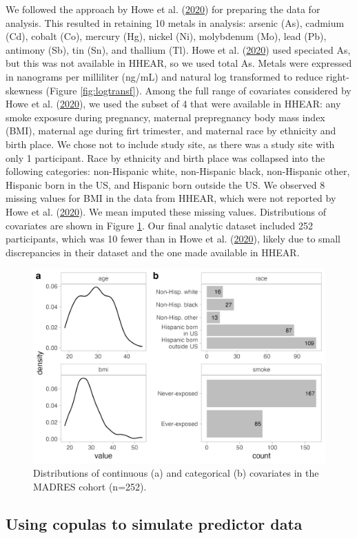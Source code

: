 \documentclass[12pt, twoside]{amherstthesis}
\begin{document}
We followed the approach by Howe et al. (\protect\hyperlink{ref-howe_prenatal_2020}{2020}) for preparing the data for analysis. This resulted in retaining 10 metals in analysis: arsenic (As), cadmium (Cd), cobalt (Co), mercury (Hg), nickel (Ni), molybdenum (Mo), lead (Pb), antimony (Sb), tin (Sn), and thallium (Tl). Howe et al. (\protect\hyperlink{ref-howe_prenatal_2020}{2020}) used speciated As, but this was not available in HHEAR, so we used total As. Metals were expressed in nanograms per milliliter (ng/mL) and natural log transformed to reduce right-skewness (Figure \ref{fig:logtransf}). Among the full range of covariates considered by Howe et al. (\protect\hyperlink{ref-howe_prenatal_2020}{2020}), we used the subset of 4 that were available in HHEAR: any smoke exposure during pregnancy, maternal prepregnancy body mass index (BMI), maternal age during firt trimester, and maternal race by ethnicity and birth place. We chose not to include study site, as there was a study site with only 1 participant. Race by ethnicity and birth place was collapsed into the following categories: non-Hispanic white, non-Hispanic black, non-Hispanic other, Hispanic born in the US, and Hispanic born outside the US. We observed 8 missing values for BMI in the data from HHEAR, which were not reported by Howe et al. (\protect\hyperlink{ref-howe_prenatal_2020}{2020}). We mean imputed these missing values. Distributions of covariates are shown in Figure \ref{fig:covdist}. Our final analytic dataset included 252 participants, which was 10 fewer than in Howe et al. (\protect\hyperlink{ref-howe_prenatal_2020}{2020}), likely due to small discrepancies in their dataset and the one made available in HHEAR.
\begin{figure}

{\centering \includegraphics[width=0.75\linewidth]{figures/ch4_covdist} 

}

\caption{Distributions of continuous (a) and categorical (b) covariates in the MADRES cohort (n=252).}\label{fig:covdist}
\end{figure}
\hypertarget{copula}{%
\subsection{Using copulas to simulate predictor data}\label{copula}}
\end{document}
